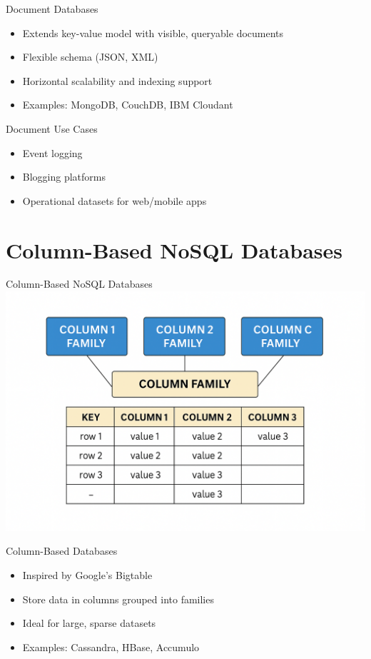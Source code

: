 \documentclass{beamer}
\begin{document}
\begin{frame}{Document Databases}
\begin{itemize}
    \item Extends key-value model with visible, queryable documents
    \item Flexible schema (JSON, XML)
    \item Horizontal scalability and indexing support
    \item Examples: MongoDB, CouchDB, IBM Cloudant
\end{itemize}
\end{frame}

\begin{frame}{Document Use Cases}
\begin{itemize}
    \item Event logging
    \item Blogging platforms
    \item Operational datasets for web/mobile apps
\end{itemize}
\end{frame}

\section{Column-Based NoSQL Databases}

\begin{frame}{\centering Column-Based NoSQL Databases}
\centering
\includegraphics[width=0.6\linewidth]{figures/column_family_diagram}
\end{frame}

\begin{frame}{Column-Based Databases}
\begin{itemize}
    \item Inspired by Google's Bigtable
    \item Store data in columns grouped into families
    \item Ideal for large, sparse datasets
    \item Examples: Cassandra, HBase, Accumulo
\end{itemize}
\end{frame}
\end{document}
